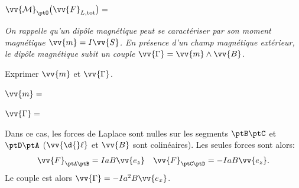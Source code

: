 
\begin{enonce}
$\vv{\mathcal{M}}_{\ptO}\big(\vv{F}_{L,\text{tot}}\big)=$
\end{enonce}


\pauseEntrainement

\medskip

\textit{On rappelle qu'un dipôle magnétique peut se caractériser par son moment magnétique $\vv{m}=I\vv{S}$. En présence d'un champ magnétique extérieur, le dipôle magnétique subit un couple $\vv{\Gamma}=\vv{m}\land\vv{B}$.}

Exprimer $\vv{m}$ et $\vv{\Gamma}$. 

\repriseEntrainement


\begin{enonce}
$\vv{m}=$
\end{enonce}




\begin{enonce}
$\vv{\Gamma}=$
\end{enonce}


\begin{corrige}
Dans ce cas, les forces de Laplace sont nulles sur les segments $\ptB\ptC$
et $\ptD\ptA$ ($\vv{\d{}\ell}$ et $\vv{B}$ sont colinéaires).
Les seules forces sont alors:
\[
\vv{F}_{\ptA\ptB}=IaB\vv{e_{z}}\quad\vv{F}_{\ptC\ptD}=-IaB\vv{e_{z}}.
\]
Le couple est alors $\vv{\Gamma}=-Ia^{2}B\vv{e_{x}}$.
\end{corrige}

